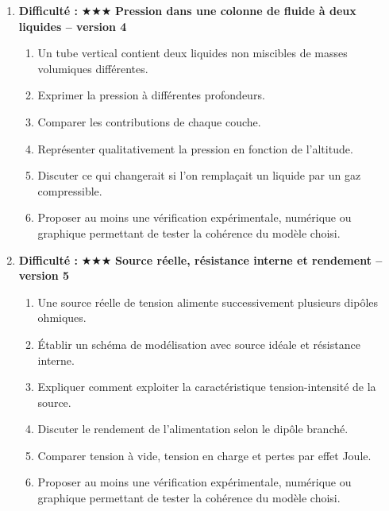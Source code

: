 \documentclass[11pt,a4paper]{article}
\newcommand{\etoiles}[1]{\textbf{Difficulté : }#1}
\begin{document}
\begin{enumerate}[label=\textbf{Problème long \arabic*.},leftmargin=*]
\begin{enumerate}[label=\alph*)]
\item Étudier séparément la phase de glissement sur la table et la phase de chute.
\item Proposer un modèle avec ou sans frottements pour la première phase.
\item Discuter le rôle de la somme des forces sur la variation de vitesse dans chaque phase.
\item Interpréter la transition entre les deux régimes de mouvement.
\item Proposer au moins une vérification expérimentale, numérique ou graphique permettant de tester la cohérence du modèle choisi.
\end{enumerate}
\item \etoiles{★★★}
\textbf{Pression dans une colonne de fluide à deux liquides -- version 4}
\begin{enumerate}[label=\alph*)]
\item Un tube vertical contient deux liquides non miscibles de masses volumiques différentes.
\item Exprimer la pression à différentes profondeurs.
\item Comparer les contributions de chaque couche.
\item Représenter qualitativement la pression en fonction de l'altitude.
\item Discuter ce qui changerait si l'on remplaçait un liquide par un gaz compressible.
\item Proposer au moins une vérification expérimentale, numérique ou graphique permettant de tester la cohérence du modèle choisi.
\end{enumerate}
\item \etoiles{★★★}
\textbf{Source réelle, résistance interne et rendement -- version 5}
\begin{enumerate}[label=\alph*)]
\item Une source réelle de tension alimente successivement plusieurs dipôles ohmiques.
\item Établir un schéma de modélisation avec source idéale et résistance interne.
\item Expliquer comment exploiter la caractéristique tension-intensité de la source.
\item Discuter le rendement de l'alimentation selon le dipôle branché.
\item Comparer tension à vide, tension en charge et pertes par effet Joule.
\item Proposer au moins une vérification expérimentale, numérique ou graphique permettant de tester la cohérence du modèle choisi.

\end{enumerate}
\end{enumerate}
\end{document}
